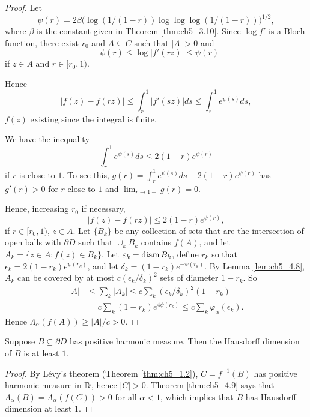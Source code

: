 \begin{proof}
Let
\begin{equation}\label{eq:ch5_4.22}
    \psi(r) = 2\beta\Big(\log(1/(1-r))\log\log\log(1/(1-r))\Big)^{1/2},
\end{equation}
where $\beta$ is the constant given in Theorem \ref{thm:ch5_3.10}. Since $\log f'$ is a Bloch function, there exist $r_0$ and $A \subseteq C$ such that $|A| > 0$ and
\mpagebreak
\[
    -\psi(r) \leq \log |f'(rz)| \leq \psi(r)
\]
if $z \in A$ and $r \in [r_0,1)$.

Hence
\[
    |f(z) - f(rz)| \leq \int_r^1 |f'(sz)|ds \leq \int_r^1 e^{\psi(s)}ds,
\]
$f(z)$ existing since the integral is finite.

We have the inequality
\[
    \int_r^1 e^{\psi(s)}ds \leq 2(1-r)e^{\psi(r)}
\]
if $r$ is close to $1$. To see this, $g(r) = \int_r^1 e^{\psi(s)}ds - 2(1-r)e^{\psi(r)}$ has $g'(r) > 0$ for $r$ close to $1$ and $\lim_{r\to 1-} g(r) = 0$.

Hence, increasing $r_0$ if necessary,
\[
    |f(z) - f(rz)| \leq 2(1-r)e^{\psi(r)},
\]
if $r \in [r_0,1)$, $z \in A$. Let $\{B_k\}$ be any collection of sets that are the intersection of open balls with $\partial D$ such that $\cup_k B_k$ contains $f(A)$, and let $A_k = \{z \in A : f(z) \in B_k\}$. Let $\varepsilon_k = \operatorname{diam} B_k$, define $r_k$ so that $\epsilon_k = 2(1-r_k)e^{\psi(r_k)}$, and let $\delta_k = (1-r_k)e^{-\psi(r_k)}$. By Lemma \ref{lem:ch5_4.8}, $A_k$ can be covered by at most $c(\epsilon_k/\delta_k)^2$ sets of diameter $1-r_k$. So
\begin{align*}
    |A| &\leq \sum_k |A_k| \leq c\sum_k(\epsilon_k/\delta_k)^2(1-r_k) \\
    &= c\sum_k(1-r_k)e^{4\psi(r_k)} \leq c\sum_k\varphi_\alpha(\epsilon_k).
\end{align*}
Hence $\Lambda_\alpha(f(A)) \geq |A|/c > 0$.
\end{proof}

\begin{corollary}\label{cor:ch5_4.10}
Suppose $B \subseteq \partial D$ has positive harmonic measure. Then the Hausdorff dimension of $B$ is at least $1$.
\end{corollary}

\begin{proof}
By L\'evy's theorem (Theorem \ref{thm:ch5_1.2}), $C = f^{-1}(B)$ has positive harmonic measure in $\mathbb{D}$, hence $|C| > 0$. Theorem \ref{thm:ch5_4.9} says that $\Lambda_\alpha(B) = \Lambda_\alpha(f(C)) > 0$ for all $\alpha < 1$, which implies that $B$ has Hausdorff dimension at least $1$.
\end{proof}

